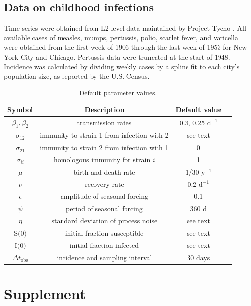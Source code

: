 \documentclass[10pt]{article}
\newcommand{\beginsupplement}{
        \setcounter{table}{0}
        \renewcommand{\thetable}{S\arabic{table}}
        \setcounter{figure}{0}
        \renewcommand{\thefigure}{S\arabic{figure}}
     }
\begin{document}
\subsection{Data on childhood infections}
Time series were obtained from L2-level data maintained by Project Tycho \cite{vanPanhuis2013}.
All available cases of measles, mumps, pertussis, polio, scarlet fever, and varicella were obtained from the first week of 1906 through the last week of 1953 for New York City and Chicago.
Pertussis data were truncated at the start of 1948.
Incidence was calculated by dividing weekly cases by a spline fit to each city's population size, as reported by the U.S. Census.



\begin{table}
\caption{Default parameter values.}
\begin{center}
\begin{tabular}{cccc}
{\bf Symbol} &{\bf Description} & {\bf Default value} \\ 
\hline
$\beta_1, \beta_2$ & transmission rates & 0.3, 0.25 $\text{d}^{-1}$ \\
$\sigma_{12}$ & immunity to strain 1 from infection with 2 & see text\\
$\sigma_{21}$ & immunity to strain 2 from infection with 1 & 0\\
$\sigma_{ii}$ & homologous immunity for strain $i$ & 1\\
$\mu$ & birth and death rate & 1/30 $\text{y}^{-1}$ \\
$\nu$ & recovery rate & 0.2 $\text{d}^{-1}$ \\
$\epsilon$ & amplitude of seasonal forcing & 0.1 \\
$\psi$ & period of seasonal forcing & 360 d\\
$\eta$ & standard deviation of process noise & see text \\
$\text{S(0)}$ & initial fraction susceptible & see text \\
$\text{I(0)}$ & initial fraction infected & see text\\
$\Delta t_\text{obs}$ & incidence and sampling interval & 30 days\\
\end {tabular}
\end{center}

\label{table:defaultParameters}
\end {table}

\beginsupplement
\section{Supplement}
\end{document}
